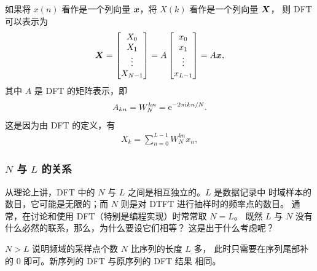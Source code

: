 \begin{definition}
    如果将 $x(n)$ 看作是一个列向量 $\bm{x}$，将 $X(k)$ 看作是一个列向量 $\bm{X}$，
    则 DFT 可以表示为
    \begin{align*}
        \bm{X} = \begin{bmatrix}
            X_0 \\ X_1 \\ \vdots \\ X_{N - 1}
        \end{bmatrix}
        = A \begin{bmatrix}
            x_0 \\ x_1 \\ \vdots \\ x_{L - 1}
        \end{bmatrix} = A\bm{x},
    \end{align*}
    其中 $A$ 是 DFT 的矩阵表示，即
    \begin{align*}
        A_{kn} = W_N^{kn} = \mathrm{e}^{-2\pi\mathrm{i} kn/N}.
    \end{align*}
    这是因为由 DFT 的定义，有
    \begin{align*}
        X_k = \sum_{n = 0}^{L - 1}W_N^{kn}x_n,
    \end{align*}
\end{definition}

\subsubsection{$N$ 与 $L$ 的关系}

从理论上讲，DFT 中的 $N$ 与 $L$ 之间是相互独立的。$L$ 是数据记录中
时域样本的数目，它可能是无限的；而 $N$ 则是对 DTFT 进行抽样时的频率点的数目。
通常，在讨论和使用 DFT（特别是编程实现）时常常取 $N = L$。
既然 $L$ 与 $N$ 没有什么必然的联系，那么，为什么要设它们相等？
这是出于什么考虑呢？

\begin{example}[$N > L$ 的情况]
    $N > L$ 说明频域的采样点个数 $N$ 比序列的长度 $L$ 多，
    此时只需要在序列尾部补的 $0$ 即可。新序列的 DFT 与原序列的 DFT 结果
    相同。
\end{example}

